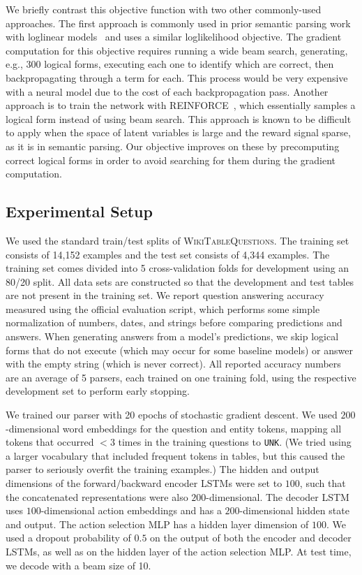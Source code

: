 We briefly contrast this objective function with two other commonly-used 
approaches. The first approach is commonly used in prior semantic parsing work 
with loglinear models~\citep{Liang2011LearningDC,pasupat2015compositional} and 
uses a similar 
loglikelihood objective. The gradient computation for this objective requires 
running a wide beam search, generating, e.g., 300 logical forms, executing each 
one to identify which are correct, then backpropagating through a term for 
each. 
This process would be very expensive with a neural model due to the cost of 
each 
backpropagation pass. Another approach is to train the network with
REINFORCE~\citep{williams1992simple}, which essentially samples a logical form instead of 
using 
beam search. This approach is known to be difficult to apply when the space of 
latent variables is large and the reward signal sparse, as it is in semantic 
parsing. Our objective improves on these by precomputing correct logical forms 
in order 
to avoid searching for them during the gradient computation.

\subsection{Experimental Setup}
We used the standard train/test splits of \textsc{WikiTableQuestions}.
The training set consists of 14,152 examples and the test set consists of 4,344 
examples.
The training set comes divided into 5 cross-validation folds for development 
using an 80/20 split.
All data sets are constructed so that the development and test tables are not 
present in the training set.
We report question answering accuracy measured using the official evaluation 
script, which performs some simple normalization of numbers, dates, and strings 
before comparing predictions and answers.
When generating answers from a model's predictions, we skip logical forms that 
do not execute (which may occur for some baseline models) or answer with the 
empty string (which is never correct).
All reported accuracy numbers are an average of 5 parsers, each trained on one 
training fold, using the respective development set to perform early stopping.

We trained our parser with 20 epochs of stochastic gradient descent. We used 
$200$-dimensional word embeddings for the question and entity tokens, mapping 
all tokens that occurred $<3$ times in the training questions to \texttt{UNK}. 
(We tried using a larger vocabulary that included frequent tokens in tables, 
but this caused the parser to seriously overfit the training examples.) The 
hidden and output dimensions of the forward/backward encoder LSTMs were set to 
$100$, such that the concatenated representations were also $200$-dimensional. 
The decoder LSTM uses $100$-dimensional action embeddings and has a 
$200$-dimensional hidden state and output. The action selection MLP has a 
hidden layer dimension of $100$. We used a dropout probability of $0.5$ on the 
output of both the encoder and decoder LSTMs, as well as on the hidden layer of 
the action selection MLP\@. At test time, we decode with a beam size of 10.

